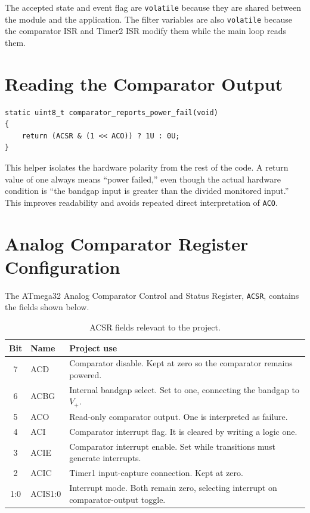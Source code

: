 \documentclass[11pt,a4paper]{article}
\begin{document}
The accepted state and event flag are \texttt{volatile} because they are shared between the module and the application. The filter variables are also \texttt{volatile} because the comparator ISR and Timer2 ISR modify them while the main loop reads them.

\section{Reading the Comparator Output}

\begin{lstlisting}[style=cstyle,caption={Conversion of ACO into a logical failure state.}]
static uint8_t comparator_reports_power_fail(void)
{
    return (ACSR & (1 << ACO)) ? 1U : 0U;
}
\end{lstlisting}

This helper isolates the hardware polarity from the rest of the code. A return value of one always means ``power failed,'' even though the actual hardware condition is ``the bandgap input is greater than the divided monitored input.'' This improves readability and avoids repeated direct interpretation of \texttt{ACO}.

\section{Analog Comparator Register Configuration}
The ATmega32 Analog Comparator Control and Status Register, \texttt{ACSR}, contains the fields shown below.

\begin{table}[H]
\centering
\caption{ACSR fields relevant to the project.}
\begin{tabular}{clp{}}
\toprule
Bit & Name & Project use \\
\midrule
7 & ACD & Comparator disable. Kept at zero so the comparator remains powered. \\
6 & ACBG & Internal bandgap select. Set to one, connecting the bandgap to $V_+$. \\
5 & ACO & Read-only comparator output. One is interpreted as failure. \\
4 & ACI & Comparator interrupt flag. It is cleared by writing a logic one. \\
3 & ACIE & Comparator interrupt enable. Set while transitions must generate interrupts. \\
2 & ACIC & Timer1 input-capture connection. Kept at zero. \\
1:0 & ACIS1:0 & Interrupt mode. Both remain zero, selecting interrupt on comparator-output toggle. \\
\bottomrule
\end{tabular}
\end{table}
\end{document}
